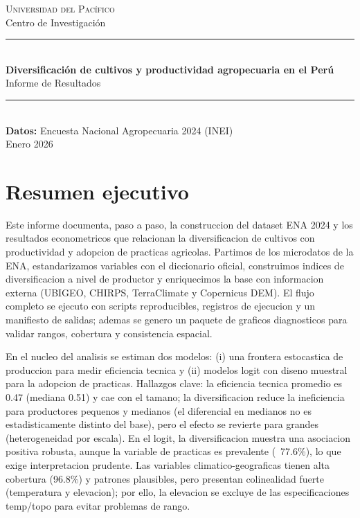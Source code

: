 \documentclass[10pt,a4paper]{article}
\begin{document}
\begin{titlepage}
    \centering
    \vspace*{1.5cm}
    {\Large\textsc{Universidad del Pacífico}}\\[0.3cm]
    {\normalsize Centro de Investigación}\\[1.5cm]
    \rule{\linewidth}{0.5mm}\\[0.3cm]
    {\LARGE\bfseries Diversificación de cultivos y productividad agropecuaria en el Perú}\\[0.2cm]
    {\Large Informe de Resultados}\\[0.3cm]
    \rule{\linewidth}{0.5mm}\\[1.5cm]
    {\normalsize\textbf{Datos:} Encuesta Nacional Agropecuaria 2024 (INEI)}\\[0.8cm]
    {\normalsize Enero 2026}\\
    \vfill
\end{titlepage}

\tableofcontents
\newpage

\section{Resumen ejecutivo}
Este informe documenta, paso a paso, la construccion del dataset ENA 2024 y los resultados econometricos que relacionan la diversificacion de cultivos con productividad y adopcion de practicas agricolas. Partimos de los microdatos de la ENA, estandarizamos variables con el diccionario oficial, construimos indices de diversificacion a nivel de productor y enriquecimos la base con informacion externa (UBIGEO, CHIRPS, TerraClimate y Copernicus DEM). El flujo completo se ejecuto con scripts reproducibles, registros de ejecucion y un manifiesto de salidas; ademas se genero un paquete de graficos diagnosticos para validar rangos, cobertura y consistencia espacial.

En el nucleo del analisis se estiman dos modelos: (i) una frontera estocastica de produccion para medir eficiencia tecnica y (ii) modelos logit con diseno muestral para la adopcion de practicas. Hallazgos clave: la eficiencia tecnica promedio es 0.47 (mediana 0.51) y cae con el tamano; la diversificacion reduce la ineficiencia para productores pequenos y medianos (el diferencial en medianos no es estadisticamente distinto del base), pero el efecto se revierte para grandes (heterogeneidad por escala). En el logit, la diversificacion muestra una asociacion positiva robusta, aunque la variable de practicas es prevalente (~77.6\%), lo que exige interpretacion prudente. Las variables climatico-geograficas tienen alta cobertura (96.8\%) y patrones plausibles, pero presentan colinealidad fuerte (temperatura y elevacion); por ello, la elevacion se excluye de las especificaciones temp/topo para evitar problemas de rango.
\end{document}
